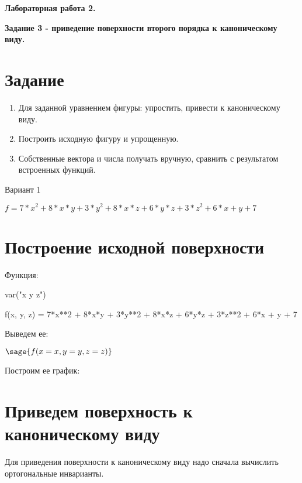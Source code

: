\documentclass{article}
\begin{document}
\begin{center}
\Large{\textbf{Лабораторная работа 2. }}  

\Large{\textbf{Задание 3 - приведение поверхности второго порядка к каноническому виду.}}
\end{center}

\section*{Задание}
\begin{enumerate}
\item Для заданной уравнением фигуры: упростить, привести к каноническому виду.
\item Построить исходную фигуру и упрощенную.
\item Собственные вектора и числа получать вручную, сравнить с результатом встроенных функций.
\end{enumerate}

\begin{center}
Вариант 1

$f = 7*x^2 + 8*x*y + 3*y^2 + 8*x*z + 6*y*z + 3*z^2 + 6*x + y + 7$
\end{center}

\section*{Построение исходной поверхности}
Функция:

\begin{sagesilent}
var("x y z")
\end{sagesilent}
\begin{sageblock}
f(x, y, z) = 7*x**2 + 8*x*y + 3*y**2 + 8*x*z + 6*y*z + 3*z**2 + 6*x + y + 7
\end{sageblock}
Выведем ее:
\begin{center}
$\sage{f(x=x, y=y, z=z)}$
\end{center}
Построим ее график:
\begin{center}
\end{center}
\newpage
\section*{Приведем поверхность к каноническому виду}

Для приведения поверхности к каноническому виду надо сначала вычислить ортогональные инварианты.
\end{document}

